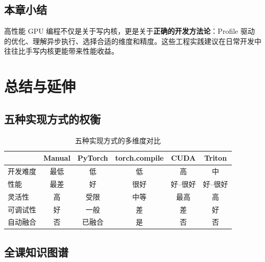 \documentclass[a4paper]{article}
\begin{document}
\subsection{本章小结}

高性能 GPU 编程不仅是关于写内核，更是关于\textbf{正确的开发方法论}：Profile 驱动的优化、理解异步执行、选择合适的维度和精度。这些工程实践建议在日常开发中往往比手写内核更能带来性能收益。


\section{总结与延伸}

\subsection{五种实现方式的权衡}

\begin{table}[H]
\centering
\begin{tabular}{lccccc}
\toprule
& \textbf{Manual} & \textbf{PyTorch} & \textbf{torch.compile} & \textbf{CUDA} & \textbf{Triton} \\
\midrule
开发难度 & 最低 & 低 & 低 & 高 & 中 \\
性能 & 最差 & 好 & 很好 & 好--很好 & 好--很好 \\
灵活性 & 高 & 受限 & 中等 & 最高 & 高 \\
可调试性 & 好 & 一般 & 差 & 差 & 好 \\
自动融合 & 否 & 已融合 & 是 & 否 & 否 \\
\bottomrule
\end{tabular}
\caption{五种实现方式的多维度对比}
\end{table}

\subsection{全课知识图谱}
\end{document}

